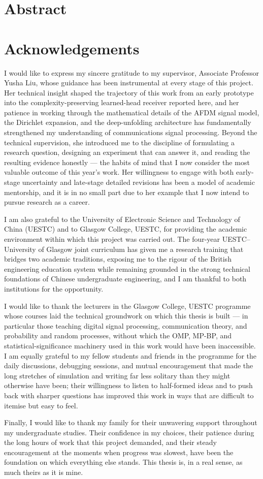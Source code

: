 \documentclass[a4paper,12pt,oneside]{article}
\renewenvironment{abstract}{
    \section*{Abstract}
    \bigskip
    \addcontentsline{toc}{section}{Abstract}
}{
    \clearpage
}
\newenvironment{acknowledgement}{
    \section*{Acknowledgements}
    \bigskip
    \addcontentsline{toc}{section}{Acknowledgements}
}{
    \clearpage
}
\begin{document}
\begin{abstract}

\end{abstract}

\begin{acknowledgement}
I would like to express my sincere gratitude to my supervisor, Associate Professor Yusha Liu, whose guidance has been instrumental at every stage of this project. Her technical insight shaped the trajectory of this work from an early prototype into the complexity-preserving learned-head receiver reported here, and her patience in working through the mathematical details of the AFDM signal model, the Dirichlet expansion, and the deep-unfolding architecture has fundamentally strengthened my understanding of communications signal processing. Beyond the technical supervision, she introduced me to the discipline of formulating a research question, designing an experiment that can answer it, and reading the resulting evidence honestly --- the habits of mind that I now consider the most valuable outcome of this year's work. Her willingness to engage with both early-stage uncertainty and late-stage detailed revisions has been a model of academic mentorship, and it is in no small part due to her example that I now intend to pursue research as a career.

I am also grateful to the University of Electronic Science and Technology of China (UESTC) and to Glasgow College, UESTC, for providing the academic environment within which this project was carried out. The four-year UESTC--University of Glasgow joint curriculum has given me a research training that bridges two academic traditions, exposing me to the rigour of the British engineering education system while remaining grounded in the strong technical foundations of Chinese undergraduate engineering, and I am thankful to both institutions for the opportunity.

I would like to thank the lecturers in the Glasgow College, UESTC programme whose courses laid the technical groundwork on which this thesis is built --- in particular those teaching digital signal processing, communication theory, and probability and random processes, without which the OMP, MP-BP, and statistical-significance machinery used in this work would have been inaccessible. I am equally grateful to my fellow students and friends in the programme for the daily discussions, debugging sessions, and mutual encouragement that made the long stretches of simulation and writing far less solitary than they might otherwise have been; their willingness to listen to half-formed ideas and to push back with sharper questions has improved this work in ways that are difficult to itemise but easy to feel.

Finally, I would like to thank my family for their unwavering support throughout my undergraduate studies. Their confidence in my choices, their patience during the long hours of work that this project demanded, and their steady encouragement at the moments when progress was slowest, have been the foundation on which everything else stands. This thesis is, in a real sense, as much theirs as it is mine.
\end{acknowledgement}
\end{document}
